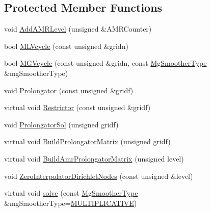 \subsection*{Protected Member Functions}
\begin{DoxyCompactItemize}
\item 
void \mbox{\hyperlink{classfemus_1_1_linear_implicit_system_aefec2ee82ef91084caf1c19e032fbb87}{Add\+A\+M\+R\+Level}} (unsigned \&A\+M\+R\+Counter)
\item 
bool \mbox{\hyperlink{classfemus_1_1_linear_implicit_system_a79a6c445a3e9a25e389aeb4b93f04fdc}{M\+L\+Vcycle}} (const unsigned \&gridn)
\item 
bool \mbox{\hyperlink{classfemus_1_1_linear_implicit_system_abaae648f9914d950798ba7a8a7f58818}{M\+G\+Vcycle}} (const unsigned \&gridn, const \mbox{\hyperlink{_mg_type_enum_8hpp_aec11e12c1f11a6ad959d3280ae0ee9a8}{Mg\+Smoother\+Type}} \&mg\+Smoother\+Type)
\item 
void \mbox{\hyperlink{classfemus_1_1_linear_implicit_system_aa22a2cbcc9585a00ef105ff6956d815f}{Prolongator}} (const unsigned \&gridf)
\item 
virtual void \mbox{\hyperlink{classfemus_1_1_linear_implicit_system_aedb71fc3d777b11b34caaee2be60c4cb}{Restrictor}} (const unsigned \&gridf)
\item 
void \mbox{\hyperlink{classfemus_1_1_linear_implicit_system_ae487c81f687e90aa05e725b68558d1ba}{Prolongator\+Sol}} (unsigned gridf)
\item 
virtual void \mbox{\hyperlink{classfemus_1_1_linear_implicit_system_a7dd4f792c3181d8b32986bbd7478e16b}{Build\+Prolongator\+Matrix}} (unsigned gridf)
\item 
virtual void \mbox{\hyperlink{classfemus_1_1_linear_implicit_system_af9a972af3c006d71da74f35954b9cecf}{Build\+Amr\+Prolongator\+Matrix}} (unsigned level)
\item 
void \mbox{\hyperlink{classfemus_1_1_linear_implicit_system_a74eca0812307b256029997b2ce504f5e}{Zero\+Interpolator\+Dirichlet\+Nodes}} (const unsigned \&level)
\item 
virtual void \mbox{\hyperlink{classfemus_1_1_linear_implicit_system_ab37c3204960b888a594fb38e0803d2e5}{solve}} (const \mbox{\hyperlink{_mg_type_enum_8hpp_aec11e12c1f11a6ad959d3280ae0ee9a8}{Mg\+Smoother\+Type}} \&mg\+Smoother\+Type=\mbox{\hyperlink{_mg_type_enum_8hpp_aec11e12c1f11a6ad959d3280ae0ee9a8a2618be531dddb3647be5874ddcae5164}{M\+U\+L\+T\+I\+P\+L\+I\+C\+A\+T\+I\+VE}})
\end{DoxyCompactItemize}
